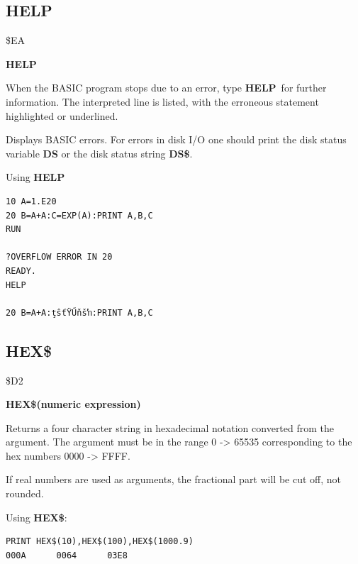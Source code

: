 \subsection{HELP}
\begin{description}[leftmargin=2cm,style=nextline]
\item [Token:] \$EA
\item [Format:] {\bf HELP}
\item [Usage:]
   When the BASIC program stops due to an error, type
   {\bf HELP} for further information.
   The interpreted line is listed, with the
   erroneous statement highlighted or underlined.

\item [Remarks:]
      Displays BASIC errors. For errors in disk
      I/O one should print the disk status variable {\bf DS}
      or the disk status string {\bf DS\$}.

\item [Example:] Using {\bf HELP}
\begin{tcolorbox}[colback=black,coltext=white]
\verbatimfont{\codefont}
\begin{verbatim}
10 A=1.E20
20 B=A+A:C=EXP(A):PRINT A,B,C
RUN

?OVERFLOW ERROR IN 20
READY.
HELP

20 B=A+A:ţŝťŸŰňšŉ:PRINT A,B,C
\end{verbatim}
\end{tcolorbox}
\end{description}


\newpage
\subsection{HEX\$}
\begin{description}[leftmargin=2cm,style=nextline]
\item [Token:] \$D2
\item [Format:] {\bf HEX\$(numeric expression)}
\item [Usage:] Returns a four
               character string in hexadecimal notation
               converted from the argument.
               The argument must be in the range 0 -> 65535
               corresponding to the hex numbers 0000 -> FFFF.

\item [Remarks:] If real numbers are used as arguments, the
                 fractional part will be cut off, not rounded.

\item [Example:] Using {\bf HEX\$}:
\begin{tcolorbox}[colback=black,coltext=white]
\verbatimfont{\codefont}
\begin{verbatim}
PRINT HEX$(10),HEX$(100),HEX$(1000.9)
000A      0064      03E8
\end{verbatim}
\end{tcolorbox}
\end{description}

